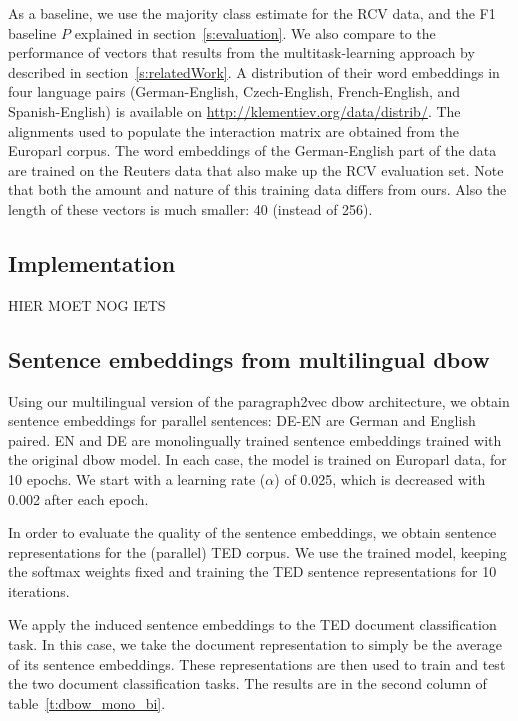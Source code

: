 As a baseline, we use the majority class estimate for the RCV data, and the F1 baseline $P$ explained in section~\ref{s:evaluation}. We also compare to the performance of vectors that results from the multitask-learning approach by \cite{klementiev2012inducing} described in section~\ref{s:relatedWork}. A distribution of their word embeddings in four language pairs (German-English, Czech-English, French-English, and Spanish-English) is available on \url{http://klementiev.org/data/distrib/}. The alignments used to populate the interaction matrix are obtained from the Europarl corpus. The word embeddings of the German-English part of the data are trained on the Reuters data that also make up the RCV evaluation set. Note that both the amount and nature of this training data differs from ours. Also the length of these vectors is much smaller: 40 (instead of 256).



\subsection{Implementation}
{\color{red} HIER MOET NOG IETS}

\subsection{Sentence embeddings from multilingual dbow}
Using our multilingual version of the paragraph2vec dbow architecture, we obtain sentence embeddings for parallel sentences: DE-EN are German and English paired. EN and DE are monolingually trained sentence embeddings trained with the original dbow model. In each case, the model is trained on Europarl data, for 10 epochs. We start with a learning rate ($\alpha$) of 0.025, which is decreased with 0.002 after each epoch.

 In order to evaluate the quality of the sentence embeddings, we obtain sentence representations for the (parallel) TED corpus. We use the trained model, keeping the softmax weights fixed and training the TED sentence representations for 10 iterations.

We apply the induced sentence embeddings to the TED document classification task. In this case, we take the document representation to simply be the average of its sentence embeddings. These representations are then used to train and test the two document classification tasks. The results are in the second column of table~\ref{t:dbow_mono_bi}. 

